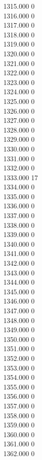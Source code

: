 { 1315.000	0 \\
 1316.000	0 \\
 1317.000	0 \\
 1318.000	0 \\
 1319.000	0 \\
 1320.000	0 \\
 1321.000	0 \\
 1322.000	0 \\
 1323.000	0 \\
 1324.000	0 \\
 1325.000	0 \\
 1326.000	0 \\
 1327.000	0 \\
 1328.000	0 \\
 1329.000	0 \\
 1330.000	0 \\
 1331.000	0 \\
 1332.000	0 \\
 1333.000	17 \\
 1334.000	0 \\
 1335.000	0 \\
 1336.000	0 \\
 1337.000	0 \\
 1338.000	0 \\
 1339.000	0 \\
 1340.000	0 \\
 1341.000	0 \\
 1342.000	0 \\
 1343.000	0 \\
 1344.000	0 \\
 1345.000	0 \\
 1346.000	0 \\
 1347.000	0 \\
 1348.000	0 \\
 1349.000	0 \\
 1350.000	0 \\
 1351.000	0 \\
 1352.000	0 \\
 1353.000	0 \\
 1354.000	0 \\
 1355.000	0 \\
 1356.000	0 \\
 1357.000	0 \\
 1358.000	0 \\
 1359.000	0 \\
 1360.000	0 \\
 1361.000	0 \\
 1362.000	0 \\
}
